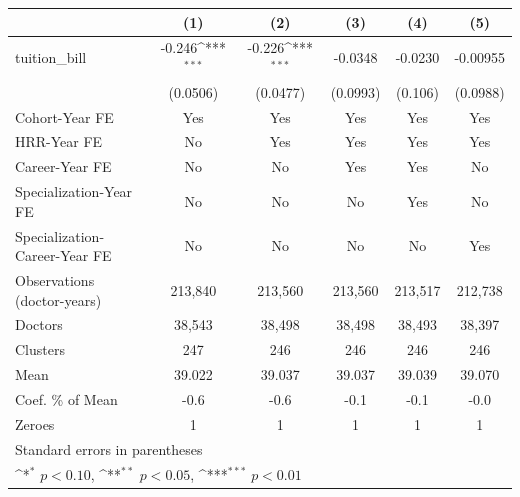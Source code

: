 {
\def\sym#1{\ifmmode^{#1}\else\(^{#1}\)\fi}
\begin{tabular}{l*{5}{c}}
\hline\hline
                    &\multicolumn{1}{c}{(1)}         &\multicolumn{1}{c}{(2)}         &\multicolumn{1}{c}{(3)}         &\multicolumn{1}{c}{(4)}         &\multicolumn{1}{c}{(5)}         \\
\hline
tuition\_bill        &      -0.246\sym{***}&      -0.226\sym{***}&     -0.0348         &     -0.0230         &    -0.00955         \\
                    &    (0.0506)         &    (0.0477)         &    (0.0993)         &     (0.106)         &    (0.0988)         \\
[1em]
Cohort-Year FE      &         Yes         &         Yes         &         Yes         &         Yes         &         Yes         \\
[1em]
HRR-Year FE         &          No         &         Yes         &         Yes         &         Yes         &         Yes         \\
[1em]
Career-Year FE      &          No         &          No         &         Yes         &         Yes         &          No         \\
[1em]
Specialization-Year FE&          No         &          No         &          No         &         Yes         &          No         \\
[1em]
Specialization-Career-Year FE&          No         &          No         &          No         &          No         &         Yes         \\
\hline
Observations (doctor-years)&     213,840         &     213,560         &     213,560         &     213,517         &     212,738         \\
Doctors             &      38,543         &      38,498         &      38,498         &      38,493         &      38,397         \\
Clusters            &         247         &         246         &         246         &         246         &         246         \\
Mean                &      39.022         &      39.037         &      39.037         &      39.039         &      39.070         \\
Coef. \% of Mean    &        -0.6         &        -0.6         &        -0.1         &        -0.1         &        -0.0         \\
Zeroes              &           1         &           1         &           1         &           1         &           1         \\
\hline\hline
\multicolumn{6}{l}{\footnotesize Standard errors in parentheses}\\
\multicolumn{6}{l}{\footnotesize \sym{*} \(p<0.10\), \sym{**} \(p<0.05\), \sym{***} \(p<0.01\)}\\
\end{tabular}
}
